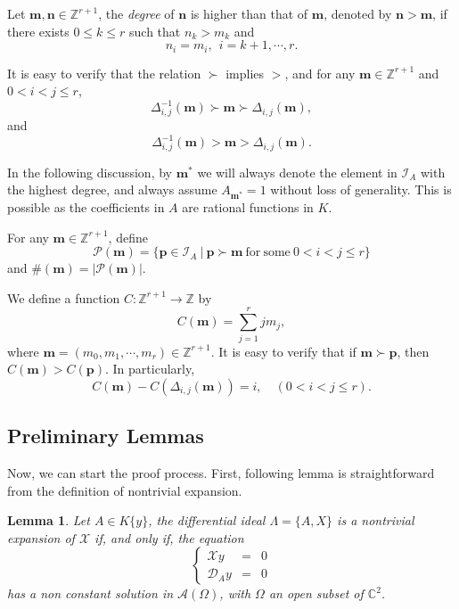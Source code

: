 \documentclass[preprint,12pt]{elsarticle}
\newtheorem{lem}[thm]{Lemma}
\begin{document}
Let $\mathbf{m}, \mathbf{n}\in {\mathbb{Z}}^{r+1}$, the \textit{degree} of
$\mathbf{n}$ is higher than that of $\mathbf{m}$, denoted by
$\mathbf{n}
> \mathbf{m}$, if there exists $0\leq k\leq r$ such that $n_k > m_k$ and
$$n_i = m_i,\ \ i = k+1, \cdots, r.$$

It is easy to verify that the relation $\succ$ implies $>$, and for any $\mathbf{m}\in \mathbb{Z}^{r+1}$ and $0 < i < j \leq r$,
\begin{equation}
\label{eq:a.12} \Delta_{i,j}^{-1}(\mathbf{m}) \succ \mathbf{m} \succ \Delta_{i,j}(\mathbf{m}),
\end{equation}
and
\begin{equation}
\label{eq:a.11} \Delta_{i,j}^{-1}(\mathbf{m}) > \mathbf{m} > \Delta_{i,j}(\mathbf{m}).
\end{equation}

In the following discussion, by $\mathbf{m}^*$ we will always denote the element in $\mathcal{I}_A$ with the highest
degree, and always assume $A_{\mathbf{m}^*} = 1$ without loss of generality. This is possible as the coefficients in $A$ are rational functions
in $K$. 

For any $\mathbf{m}\in \mathbb{Z}^{r+1}$, define
\begin{equation}
\label{eq:a.13} \mathcal{P}(\mathbf{m}) = \{\mathbf{p}\in \mathcal{I}_A\ |\
\mathbf{p}\succ \mathbf{m}\ \mathrm{for\ some}\ 0< i<j\leq r\}
\end{equation}
 and
$\#(\mathbf{m}) = |\mathcal{P}(\mathbf{m})|$. 

We define a function $C:\mathbb{Z}^{r+1}\to \mathbb{Z}$ by
\begin{equation}
\label{eq:a.5} C({\mathbf{m}}) = \sum_{j=1}^r jm_j,
\end{equation}
where $\mathbf{m} = (m_0, m_1, \cdots, m_r)\in \mathbb{Z}^{r+1}$.  It is easy to verify that if
$\mathbf{m}\succ \mathbf{p}$, then $C(\mathbf{m}) >
C(\mathbf{p})$. In particularly,  
\begin{equation}
\label{eq:a.c}
 C(\mathbf{m}) - C(\Delta_{i,j}(\mathbf{m})) = i,\quad (0<i<j\leq r).
\end{equation}

\subsection{Preliminary Lemmas}

Now, we can start the proof process. First, following lemma is straightforward from the definition of nontrivial expansion.
\begin{lem}
\label{le:0}
Let $A\in K\{y\}$, the differential ideal $\Lambda = \{A, X\}$ is a nontrivial expansion of $\mathscr{X}$ if, and only if, the equation
\begin{equation}
\label{eq:xa}
\left\{
\begin{array}{rcl}
\mathscr{X}y &=& 0\\
\mathscr{D}_Ay &=& 0
\end{array}\right.
\end{equation}
has a non constant solution in $\mathcal{A}(\Omega)$, with $\Omega$ an open subset of $\mathbb{C}^2$.
\end{lem}
\end{document}
